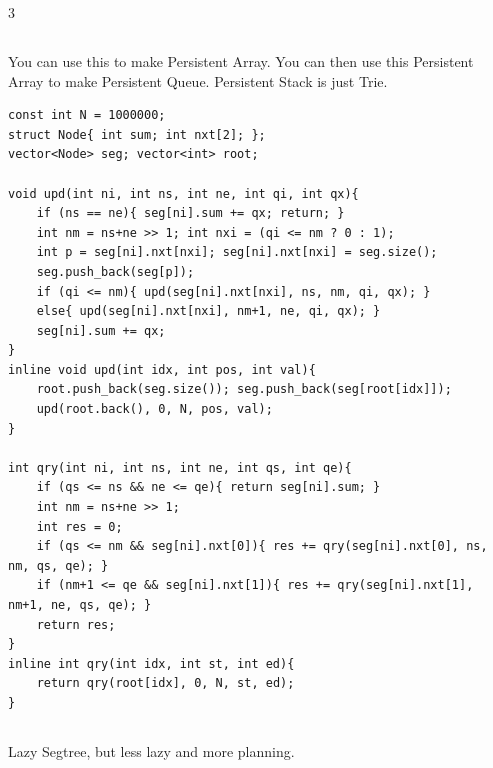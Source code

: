 \documentclass[landscape, 8pt, a4paper, oneside]{extarticle}
\begin{document}
\begin{multicols*}{3}
\subsection{}
You can use this to make Persistent Array. You can then use this Persistent Array to make Persistent Queue.
Persistent Stack is just Trie.
\begin{verbatim}
const int N = 1000000;
struct Node{ int sum; int nxt[2]; };
vector<Node> seg; vector<int> root;

void upd(int ni, int ns, int ne, int qi, int qx){
	if (ns == ne){ seg[ni].sum += qx; return; }
	int nm = ns+ne >> 1; int nxi = (qi <= nm ? 0 : 1);
	int p = seg[ni].nxt[nxi]; seg[ni].nxt[nxi] = seg.size();
	seg.push_back(seg[p]);
	if (qi <= nm){ upd(seg[ni].nxt[nxi], ns, nm, qi, qx); }
	else{ upd(seg[ni].nxt[nxi], nm+1, ne, qi, qx); }
	seg[ni].sum += qx;
}
inline void upd(int idx, int pos, int val){
	root.push_back(seg.size()); seg.push_back(seg[root[idx]]);
	upd(root.back(), 0, N, pos, val);
}

int qry(int ni, int ns, int ne, int qs, int qe){
	if (qs <= ns && ne <= qe){ return seg[ni].sum; }
	int nm = ns+ne >> 1;
	int res = 0;
	if (qs <= nm && seg[ni].nxt[0]){ res += qry(seg[ni].nxt[0], ns, nm, qs, qe); }
	if (nm+1 <= qe && seg[ni].nxt[1]){ res += qry(seg[ni].nxt[1], nm+1, ne, qs, qe); }
	return res;
}
inline int qry(int idx, int st, int ed){
	return qry(root[idx], 0, N, st, ed);
}
\end{verbatim}
\subsection{}
Lazy Segtree, but less lazy and more planning.


\end{multicols*}
\end{document}
